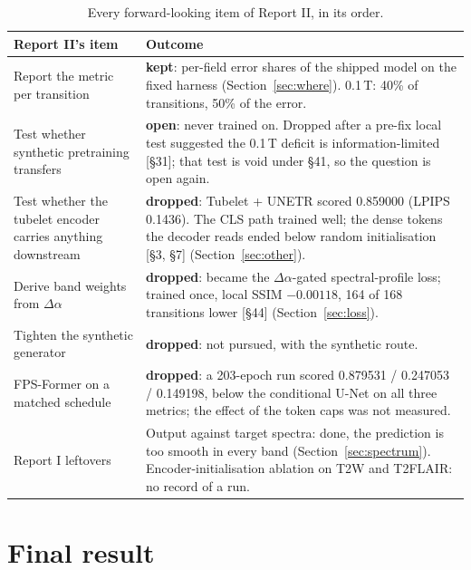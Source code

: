 \documentclass[10pt,a4paper]{article}
\newcommand{\da}{\Delta\alpha}
\newcommand{\statkept}{\textcolor{keep}{\textbf{kept}}}
\newcommand{\statdropped}{\textcolor{accent}{\textbf{dropped}}}
\newcommand{\statopen}{\textcolor{live}{\textbf{open}}}
\begin{document}
\begin{table}[H]
\centering\small
\begin{tabular}{p{4.2cm}p{11.8cm}}
\toprule
Report II's item & Outcome \\
\midrule
Report the metric per transition &
  \statkept: per-field error shares of the shipped model on the fixed harness
  (Section~\ref{sec:where}). 0.1\,T: 40\% of transitions, 50\% of the error. \\
Test whether synthetic pretraining transfers &
  \statopen: never trained on. Dropped after a pre-fix local test suggested the 0.1\,T deficit is
  information-limited [\S31]; that test is void under \S41, so the question is open again. \\
Test whether the tubelet encoder carries anything downstream &
  \statdropped: Tubelet + UNETR scored 0.859000 (LPIPS 0.1436). The CLS path trained well; the
  dense tokens the decoder reads ended below random initialisation [\S3, \S7]
  (Section~\ref{sec:other}). \\
Derive band weights from $\da$ &
  \statdropped: became the $\da$-gated spectral-profile loss; trained once, local SSIM
  $-0.00118$, 164 of 168 transitions lower [\S44] (Section~\ref{sec:loss}). \\
Tighten the synthetic generator & \statdropped: not pursued, with the synthetic route. \\
FPS-Former on a matched schedule &
  \statdropped: a 203-epoch run scored 0.879531 / 0.247053 / 0.149198, below the conditional
  U-Net on all three metrics; the effect of the token caps was not measured. \\
Report I leftovers &
  Output against target spectra: done, the prediction is too smooth in every band
  (Section~\ref{sec:spectrum}). Encoder-initialisation ablation on T2W and T2FLAIR: no record of
  a run. \\
\bottomrule
\end{tabular}
\caption{Every forward-looking item of Report II, in its order.}
\label{tab:plans}
\end{table}

\section{Final result}\label{sec:final}
\end{document}
